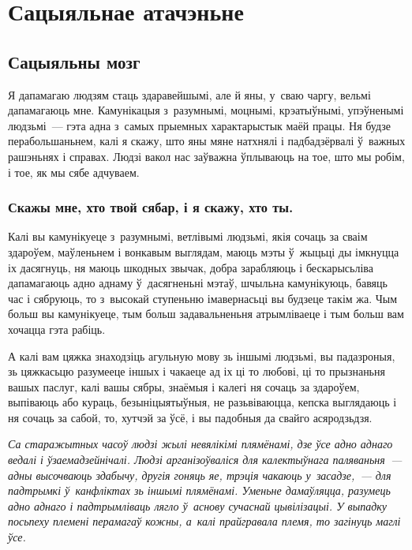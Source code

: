 \chapter{Сацыяльнае атачэньне}

\section{Сацыяльны мозг}

Я дапамагаю людзям стаць здаравейшымі, але й яны, у~сваю чаргу, вельмі дапамагаюць мне. Камунікацыя з~разумнымі, моцнымі, крэатыўнымі, упэўненымі людзьмі~--- гэта адна з~самых прыемных характарыстык маёй працы. Ня будзе перабольшаньнем, калі я скажу, што яны мяне натхнялі і падбадзёрвалі ў~важных рашэньнях і справах. Людзі вакол нас заўважна ўплываюць на тое, што мы робім, і тое, як мы сябе адчуваем.

\subsection*{Скажы мне, хто твой сябар, і я скажу, хто ты.}

Калі вы камунікуеце з~разумнымі, ветлівымі людзьмі, якія сочаць за сваім здароўем, маўленьнем і вонкавым выглядам, маюць мэты ў~жыцьці ды імкнуцца іх дасягнуць, ня маюць шкодных звычак, добра зарабляюць і бескарысьліва дапамагаюць адно аднаму ў~дасягненьні мэтаў, шчыльна камунікуюць, бавяць час і сябруюць, то з~высокай ступеньню імавернасьці вы будзеце такім жа. Чым больш вы камунікуеце, тым больш задавальненьня атрымліваеце і тым больш вам хочацца гэта рабіць.

А калі вам цяжка знаходзіць агульную мову зь іншымі людзьмі, вы падазроныя, зь цяжкасьцю разумееце іншых і чакаеце ад іх ці то любові, ці то прызнаньня вашых паслуг, калі вашы сябры, знаёмыя і калегі ня сочаць за здароўем, выпіваюць або кураць, безыніцыятыўныя, не разьвіваюцца, кепска выглядаюць і ня сочаць за сабой, то, хутчэй за ўсё, і вы падобныя да свайго асяродзьдзя.


\emph{Са старажытных часоў людзі жылі невялікімі плямёнамі, дзе ўсе адно аднаго ведалі і ўзаемадзейнічалі. Людзі арганізоўваліся для калектыўнага паляваньня~--- адны высочваюць здабычу, другія гоняць яе, трэція чакаюць у~засадзе,~--- для падтрымкі ў~канфліктах зь іншымі плямёнамі. Уменьне дамаўляцца, разумець адно аднаго і падтрымліваць лягло ў~аснову сучаснай цывілізацыі. У выпадку посьпеху племені перамагаў кожны, а~калі прайгравала племя, то загінуць маглі ўсе.}


